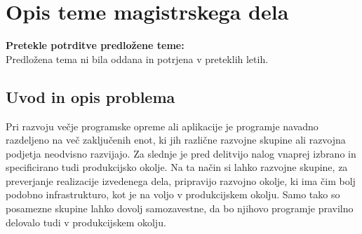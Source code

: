 \documentclass[a4paper, 12pt]{article}
\newcommand\cmnt[1]{\textcolor{munsell}{#1}}
\begin{document}
\section{Opis teme magistrskega dela}


\textbf{Pretekle potrditve predložene teme:}\\
Predložena tema ni bila oddana in potrjena v preteklih letih.

\subsection{Uvod in opis problema}

Pri razvoju večje programske opreme ali aplikacije je programje navadno razdeljeno na več zaključenih enot, ki jih različne razvojne skupine ali razvojna podjetja neodvisno razvijajo. Za slednje je pred delitvijo nalog vnaprej izbrano in specificirano tudi produkcijsko okolje. Na ta način si lahko razvojne skupine, za preverjanje realizacije izvedenega dela, pripravijo razvojno okolje, ki ima čim bolj podobno infrastrukturo, kot je na voljo v produkcijskem okolju. Samo tako so posamezne skupine lahko dovolj samozavestne, da bo njihovo programje pravilno delovalo tudi v produkcijskem okolju.
\end{document}
